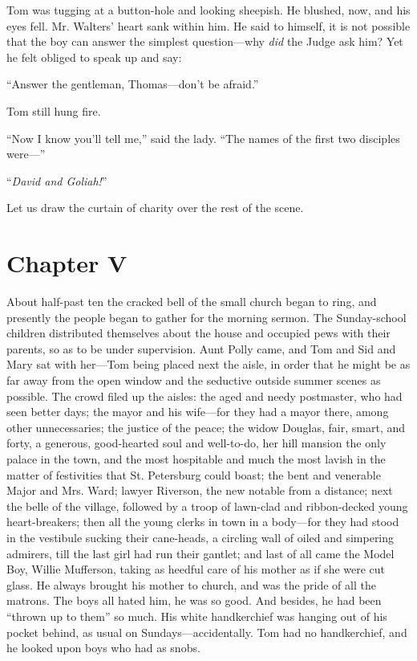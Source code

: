 \documentclass{book}
\begin{document}
Tom was tugging at a button-hole and looking sheepish. He blushed, now, and his eyes fell. Mr. Walters’ heart sank within him. He said to himself, it is not possible that the boy can answer the simplest question—why \emph{did} the Judge ask him? Yet he felt obliged to speak up and say:

“Answer the gentleman, Thomas—don’t be afraid.”

Tom still hung fire.

“Now I know you’ll tell me,” said the lady. “The names of the first two disciples were—”

“\emph{David and Goliah!}”

Let us draw the curtain of charity over the rest of the scene.

\chapter*{Chapter V}

About half-past ten the cracked bell of the small church began to ring, and presently the people began to gather for the morning sermon. The Sunday-school children distributed themselves about the house and occupied pews with their parents, so as to be under supervision. Aunt Polly came, and Tom and Sid and Mary sat with her—Tom being placed next the aisle, in order that he might be as far away from the open window and the seductive outside summer scenes as possible. The crowd filed up the aisles: the aged and needy postmaster, who had seen better days; the mayor and his wife—for they had a mayor there, among other unnecessaries; the justice of the peace; the widow Douglas, fair, smart, and forty, a generous, good-hearted soul and well-to-do, her hill mansion the only palace in the town, and the most hospitable and much the most lavish in the matter of festivities that St. Petersburg could boast; the bent and venerable Major and Mrs. Ward; lawyer Riverson, the new notable from a distance; next the belle of the village, followed by a troop of lawn-clad and ribbon-decked young heart-breakers; then all the young clerks in town in a body—for they had stood in the vestibule sucking their cane-heads, a circling wall of oiled and simpering admirers, till the last girl had run their gantlet; and last of all came the Model Boy, Willie Mufferson, taking as heedful care of his mother as if she were cut glass. He always brought his mother to church, and was the pride of all the matrons. The boys all hated him, he was so good. And besides, he had been “thrown up to them” so much. His white handkerchief was hanging out of his pocket behind, as usual on Sundays—accidentally. Tom had no handkerchief, and he looked upon boys who had as snobs.
\end{document}

